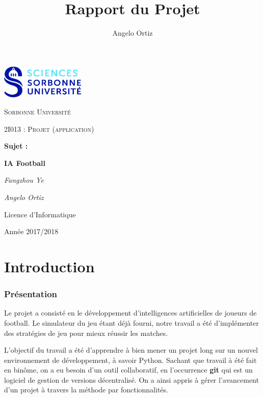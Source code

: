 \documentclass[12pt,a4paper]{article}
\author{Angelo Ortiz}
\title{Rapport du Projet}
\begin{document}
\begin{titlepage}
  \centering
  \includegraphics[width=0.30\textwidth]{logo.jpg}\par\vspace{1cm}
  {\scshape\LARGE Sorbonne Universit\'e\par}
  \vspace{1cm}
  {\scshape\Large 2I013 : Projet (application)\par}
  \vspace{1.5cm}
  {\Large \bfseries Sujet :\par}
  {\huge\bfseries IA Football\par}
  \vspace{2cm}
  {\Large\itshape Fangzhou Ye\par}
  {\Large\itshape Angelo Ortiz\par}
  \vfill
  
  {\large Licence d'Informatique\par}
  {\large Ann\'ee 2017/2018\par}
\end{titlepage}
 
\tableofcontents
  
\newpage
  
\part*{Introduction}
\section*{Pr\'esentation}
Le projet a consist\'e en le d\'eveloppement d'intelligences artificielles de 
joueurs de football. Le simulateur du jeu \'etant d\'ej\`a fourni, notre 
travail a \'et\'e d'impl\'ementer des strat\'egies de jeu pour mieux r\'eussir 
les matches.

L’objectif du travail a \'et\'e d'apprendre \`a bien mener un projet long 
sur un nouvel environnement de d\'eveloppement, \`a savoir 
Python. Sachant que travail \`a \'et\'e fait en bin\^ome, on a eu 
besoin d'un outil collaboratif, en l'occurrence {\bfseries git} qui est un 
logiciel de gestion de versions d\'ecentralis\'e. On a ainsi appris \`a g\'erer 
l'avancement d'un projet \`a travers la m\'ethode par fonctionnalit\'es.
\end{document}
